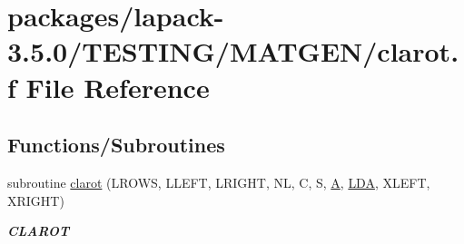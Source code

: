 \hypertarget{clarot_8f}{}\section{packages/lapack-\/3.5.0/\+T\+E\+S\+T\+I\+N\+G/\+M\+A\+T\+G\+E\+N/clarot.f File Reference}
\label{clarot_8f}
\subsection*{Functions/\+Subroutines}
\begin{DoxyCompactItemize}
\item 
subroutine \hyperlink{group__complex__matgen_ga8b101f20bbd35d0294b4579e539dc607}{clarot} (L\+R\+O\+W\+S, L\+L\+E\+F\+T, L\+R\+I\+G\+H\+T, N\+L, C, S, \hyperlink{classA}{A}, \hyperlink{example__user_8c_ae946da542ce0db94dced19b2ecefd1aa}{L\+D\+A}, X\+L\+E\+F\+T, X\+R\+I\+G\+H\+T)
\begin{DoxyCompactList}\small\item\em {\bfseries C\+L\+A\+R\+O\+T} \end{DoxyCompactList}\end{DoxyCompactItemize}
